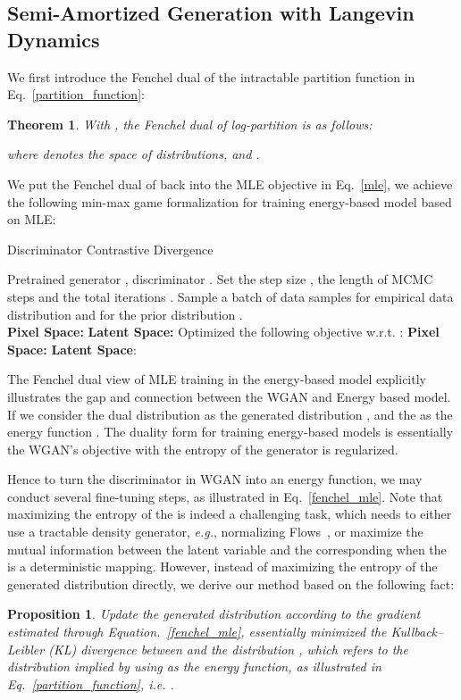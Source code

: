\documentclass{article}
\newtheorem{theorem}{Theorem}
\newtheorem{proposition}{Proposition}
\begin{document}
\subsection{Semi-Amortized Generation with Langevin Dynamics}
\label{sec::energyofcritic}
We first introduce the Fenchel dual of the intractable partition function  in Eq.~\ref{partition_function}:
\begin{theorem}\cite{wainwright2008graphical}
    With , the Fenchel dual of log-partition  is as follows:
    
    where  denotes the space of distributions, and .
\end{theorem}
We put the Fenchel dual of  back into the MLE objective in Eq.~\ref{mle}, we achieve the following min-max game formalization for training energy-based model based on MLE:


\begin{algorithm}[t]
  \caption{Discriminator Contrastive Divergence}
  \label{DCD}
  \begin{algorithmic}[1]
   Pretrained generator , discriminator .
  \STATE Set the step size , the length of MCMC steps  and the total iterations .
  \STATE Sample a batch of data samples  for empirical data distribution  and  for the prior distribution .\\
     \STATE \textbf{Pixel Space:}  \OR
     \STATE \textbf{Latent Space:} 
   \ENDFOR
   \STATE Optimized the following objective w.r.t. :
   \STATE \textbf{Pixel Space:}  \OR
   \STATE \textbf{Latent Space}: 
  \ENDFOR
\end{algorithmic}
\end{algorithm}

The Fenchel dual view of MLE training in the energy-based model explicitly illustrates the gap and connection between the WGAN and Energy based model. If we consider the dual distribution  as the generated distribution , and the  as the energy function . The duality form for training energy-based models is essentially the WGAN's objective with the entropy of the generator is regularized.

Hence to turn the discriminator in WGAN into an energy function, we may conduct several fine-tuning steps, as illustrated in Eq.~\ref{fenchel_mle}. Note that maximizing the entropy of the  is indeed a challenging task, which needs to either use a tractable density generator, \emph{e.g.}, normalizing Flows~\cite{realnvp}, or maximize the mutual information between the latent variable  and the corresponding  when the  is a deterministic mapping. However, instead of maximizing the entropy of the generated distribution  directly, we derive our method based on the following fact: 
\begin{proposition}\cite{kim2016deep}\label{prop1}
    Update the generated distribution  according to the gradient estimated through Equation.~\ref{fenchel_mle}, essentially minimized the Kullback–Leibler (KL) divergence between  and the distribution , which refers to the distribution implied by using  as the energy function, as illustrated in Eq.~\ref{partition_function}, \emph{i.e.} .
\end{proposition}
\end{document}
